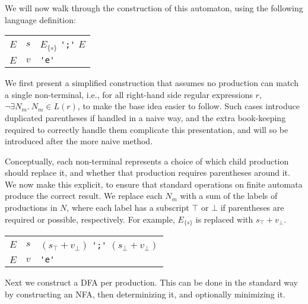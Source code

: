 \documentclass[acmsmall,review,anonymous]{acmart}\settopmatter{printfolios=true,printccs=false,printacmref=false}
\begin{document}
We will now walk through the construction of this automaton, using the following language definition:

\begin{center}
\begin{tabular}{@{}l@{\quad$->$\quad}l@{ $:$\quad}l@{}}
  \toprule
  $E$ & $s$ & $E_{\{s\}}$ \verb|';'| $E$ \\
  $E$ & $v$ & \verb|'e'| \\
  \bottomrule
\end{tabular}
\end{center}

\noindent We first present a simplified construction that assumes no production can match a single non-terminal, i.e., for all right-hand side regular expressions $r$, $\neg \exists N_m.\ N_m \in L(r)$, to make the base idea easier to follow. Such cases introduce duplicated parentheses if handled in a naive way, and the extra book-keeping required to correctly handle them complicate this presentation, and will so be introduced after the more naive method.

Conceptually, each non-terminal represents a choice of which child production should replace it, and whether that production requires parentheses around it. We now make this explicit, to ensure that standard operations on finite automata produce the correct result. We replace each $N_m$ with a sum of the labels of productions in $N$, where each label has a subscript $\top$ or $\bot$ if parentheses are required or possible, respectively. For example, $E_{\{s\}}$ is replaced with $s_\top + v_\bot$.

\begin{center}
\begin{tabular}{@{}l@{\quad$->$\quad}l@{ $:$\quad}l@{}}
  \toprule
  $E$ & $s$ & $(s_\top + v_\bot)$ \verb|';'| $(s_\bot + v_\bot)$ \\
  $E$ & $v$ & \verb|'e'| \\
  \bottomrule
\end{tabular}
\end{center}

\noindent Next we construct a DFA per production. This can be done in the standard way by constructing an NFA, then determinizing it, and optionally minimizing it.

\begin{center}
\end{center}
\end{document}
